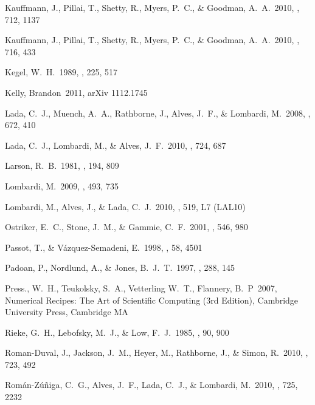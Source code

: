 \begin{thebibliography}{25}
 Kauffmann, J.,
Pillai, T., Shetty, R., Myers, P.~C.,
\& Goodman, A.~A.\ 2010, \apj, 712, 1137

 Kauffmann, J.,
Pillai, T., Shetty, R., Myers, P.~C.,
\& Goodman, A.~A.\ 2010, \apj, 716, 433

 Kegel, W.~H.\ 1989, \aap, 225, 517

 Kelly, Brandon\ 2011, arXiv 1112.1745

 Lada, C.~J., Muench,
A.~A., Rathborne, J., Alves, J.~F., \& Lombardi, M.\ 2008, \apj, 672, 410

 Lada, C.~J., Lombardi, M.,
\& Alves, J.~F.\ 2010, \apj, 724, 687

 Larson, R.~B.\ 1981, \mnras,
194, 809

 Lombardi, M.\ 2009, \aap, 493, 735


 Lombardi, M., Alves, J., \& Lada, C.~J.\ 2010, \aap, 519, L7 (LAL10)



 Ostriker, E.~C.,
Stone, J.~M., \& Gammie, C.~F.\ 2001, \apj, 546, 980

 Passot, T., \& V{\'a}zquez-Semadeni, E.\ 1998, \pre, 58, 4501

 Padoan, P., Nordlund,
A., \& Jones, B.~J.~T.\ 1997, \mnras, 288, 145

 Press., W.~H., Teukolsky, S.~A., Vetterling W.~T., Flannery, B.~P\ 2007, Numerical Recipes: The Art of Scientific Computing (3rd Edition), Cambridge University Press, Cambridge MA

 Rieke, G.~H., Lebofsky,
M.~J., \& Low, F.~J.\ 1985, \aj, 90, 900

 Roman-Duval, J.,
Jackson, J.~M., Heyer, M., Rathborne, J.,
\& Simon, R.\ 2010, \apj, 723, 492

Rom{\'a}n-Z{\'u}{\~n}iga, C.~G., Alves, J.~F., Lada, C.~J.,
\& Lombardi, M.\ 2010, \apj, 725, 2232


\end{thebibliography}
